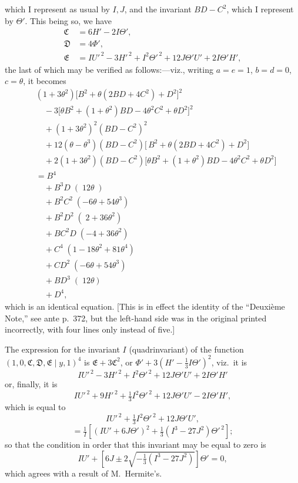 \documentclass[11pt]{article}
\begin{document}
which I represent as usual by $I,J$, and the invariant $BD-C^{2}$, which I represent by
$\Theta'$. This being so, we have
\begin{align*}
\mathfrak{C} &= 6H'-2I\Theta', \\
\mathfrak{D} &= 4\Phi', \\
\mathfrak{E} &= IU'^{\,2}-3H'^{\,2}+I^{2}\Theta'^{\,2}+12J\Theta'U'+2I\Theta'H',
\end{align*}
the last of which may be verified as follows:---viz., writing $a=e=1$, $b=d=0$, $c=\theta$, it
becomes
\begin{align*}
&(1+3\theta^{2})\bigl[B^{2}+\theta(2BD+4C^{2})+D^{2}\bigr]^{2} \\
&\quad -3\bigl[\theta B^{2}+(1+\theta^{2})BD-4\theta^{2}C^{2}+\theta D^{2}\bigr]^{2} \\
&\quad +(1+3\theta^{2})^{2}(BD-C^{2})^{2} \\
&\quad +12(\theta-\theta^{3})(BD-C^{2})\bigl[\,B^{2}+\theta(2BD+4C^{2})+D^{2}\bigr] \\
&\quad +2(1+3\theta^{2})(BD-C^{2})\bigl[\theta B^{2}+(1+\theta^{2})BD-4\theta^{2}C^{2}+\theta D^{2}\bigr] \\
&= B^{4} \\
&\quad +B^{3}D\;(\;12\theta\;) \\
&\quad +B^{2}C^{2}\;(-6\theta+54\theta^{3}) \\
&\quad +B^{2}D^{2}\;(\;2+36\theta^{2}) \\
&\quad +BC^{2}D\;(-4+36\theta^{2}) \\
&\quad +C^{4}\;(1-18\theta^{2}+81\theta^{4}) \\
&\quad +CD^{2}\;(-6\theta+54\theta^{3}) \\
&\quad +BD^{3}\;(\;12\theta) \\
&\quad +D^{4},
\end{align*}
which is an identical equation. [This is in effect the identity of the ``Deuxi\`eme Note,''
see ante p.~372, but the left-hand side was in the original printed incorrectly, with four
lines only instead of five.]

The expression for the invariant $I$ (quadrinvariant) of the function
$(1,0,\mathfrak{C},\mathfrak{D},\mathfrak{E} \mid y,1)^{4}$ is $\mathfrak{E}+3\mathfrak{C}^{2}$, or
$\Phi'+3(H'-\tfrac{1}{3}I\Theta')^{2}$, viz.\ it is
\[ IU'^{\,2}-3H'^{\,2}+I^{2}\Theta'^{\,2}+12J\Theta'U'+2I\Theta'H' \]
or, finally, it is
\[ IU'^{\,2}+9H'^{\,2}+\tfrac{1}{3}I^{2}\Theta'^{\,2}+12J\Theta'U'-2I\Theta'H', \]
which is equal to
\[ IU'^{\,2}+\tfrac{1}{3}I^{2}\Theta'^{\,2}+12J\Theta'U', \]
\[ =\tfrac{1}{I}\!\left[(IU'+6J\Theta')^{2}+\tfrac{1}{3}(I^{3}-27J^{2})\Theta'^{\,2}\right]; \]
so that the condition in order that this invariant may be equal to zero is
\[ IU'+\!\left[6J\pm 2\sqrt{-\tfrac{1}{3}(I^{3}-27J^{2})}\right]\Theta'=0, \]
which agrees with a result of M.~Hermite's.
\end{document}
